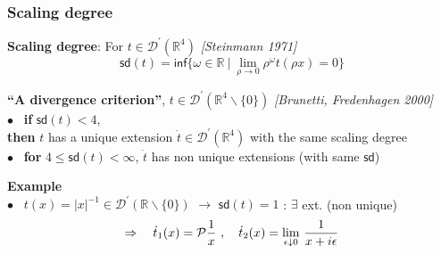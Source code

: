 \documentclass[9pt]{beamer}
\newcommand{\abs}[1]{\left|{#1}\right|} %
\newcommand{\logar}{\mathsf{log}} %
\renewcommand{\inf}{\mathsf{inf}} %
\newcommand{\sd}{\mathsf{sd}} %
\newcommand{\citebeam}[1]{\textit{\textcolor{black!60!white}{[#1]}}} %
\newcommand{\Dcal}{\mathcal{D}}
\newcommand{\Pcal}{\mathcal{P}}
\newcommand{\Rbb}{\mathbb{R}}
\begin{document}
\begin{frame}

\frametitle{Scaling degree}

\vfill

\textbf{Scaling degree}: For $t \in \Dcal^\prime(\Rbb^4)$ \citebeam{Steinmann 1971} 
\\[-15pt]
\begin{equation*}
\sd(t) = \inf \{\omega\in\Rbb \ | \ \lim_{\rho \to 0}\rho^\omega t(\rho x)=0 \} 
\end{equation*}

\vfill

\begin{block}{}
\vspace*{-10pt}
\textbf{``A divergence criterion''}, $t \in \Dcal^\prime(\Rbb^4\backslash\{0\})$ \quad \citebeam{Brunetti, Fredenhagen 2000} \\
$\bullet$ \ \textbf{if} $\sd(t) < 4$, \\
\hspace*{8pt} \textbf{then} $t$ has a unique extension $\dot{t} \in \Dcal^\prime(\Rbb^4)$ with the same scaling degree \\
$\bullet$ \ \textbf{for} $4 \leq \sd(t) < \infty$, $\dot{t}$ has non unique extensions (with same $\sd$)
\end{block}

\vfill

\textbf{Example} \\[2pt]


$\bullet$ \ $t(x) = \abs{x}^{-1} \in \Dcal^\prime(\Rbb\backslash\{0\})$ $\to$ $\sd(t) = 1$ : $\exists$ ext. (non unique) \\
\vspace*{-14pt}
\begin{equation*}
\Rightarrow \quad \dot{t}_1(x) = \Pcal\frac1x \ , \quad \dot{t}_2(x) = \underset{\epsilon \downarrow 0}{\lim} \ \frac{1}{x + i \epsilon}
\vspace*{-2pt}
\end{equation*}

\vfill
 
\end{frame}
\end{document}
